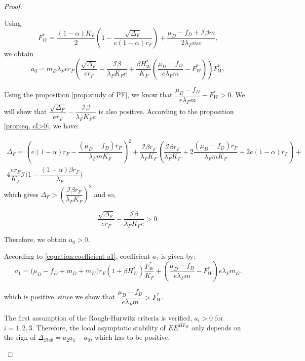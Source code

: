\documentclass{article}
\newcommand{\lfw}{\lambda_{F}}
\newcommand{\lfw}{\lambda_{F}}
\newcommand{\cI}{\mathcal{I}}
\begin{document}
\begin{proof}
\begin{itemize}
Using
\begin{equation*}
F_W^* = \dfrac{(1-\alpha)K_F}{2}\left(1 - \dfrac{\sqrt{\Delta_F}}{e(1-\alpha)r_F}\right) + \dfrac{\mu_D - f_D + \cI \beta m}{2\lfw m e},
\end{equation*}
we obtain
\begin{equation*}
a_0 = m_D \lfw e r_F \left(\dfrac{\sqrt{\Delta_F}}{er_F} - \dfrac{\cI \beta}{\lfw K_F e} +  \dfrac{\beta H_W^*}{K_F} \left(\dfrac{\mu_D -f_D }{e \lfw m} - F_W^*\right)\right)  F^*_{W},
\end{equation*}

Using the proposition \ref{prop:study of PF}, we know that $\dfrac{\mu_D -f_D }{e \lfw m} - F_W^* > 0$. We will show that  $\dfrac{\sqrt{\Delta_F}}{er_F} - \dfrac{\cI \beta}{\lfw K_F e}$ is also positive. According to the proposition \ref{prop:eq, cI>0}, we have:

\begin{multline*}
\Delta_F = \left(e(1-\alpha)r_F - \dfrac{(\mu_D - f_D) r_F}{\lfw m K_F}\right)^2 + \dfrac{\cI \beta r_F}{\lfw K_F} \left(\dfrac{\cI \beta r_F}{\lfw K_F} + 2\dfrac{(\mu_D - f_D) r_F}{\lfw m K_F} + 2e(1-\alpha)r_F \right) + \\ 4\dfrac{er_F}{K_F}  \cI\Big(1 - \dfrac{(1-\alpha)\beta r_F}{\lfw} \Big)
\end{multline*}
 which gives $\Delta_F > \left(\dfrac{\cI \beta r_F}{\lfw K_F}\right)^2$ and so,

\begin{equation*}
\dfrac{\sqrt{\Delta_F}}{er_F} - \dfrac{\cI \beta}{\lfw K_F e} > 0.
\end{equation*}

Therefore, we obtain $a_0 > 0$.

According to \eqref{equation:coefficient a1}, coefficient $a_1$ is given by:
\begin{equation*}
a_1 = \big( \mu_D  -f_D + m_D + m_W) r_F(1+ \beta H_W^*) \dfrac{F^*_W}{K_F} + \left(\dfrac{\mu_D -f_D}{e\lfw m} - F_W^*\right) e \lfw m_D .
\end{equation*}

which is positive, since we show that $\dfrac{\mu_D - f_D}{e \lfw m} > F^*_{W}$.

The first assumption of the Rough-Hurwitz criteria is verified, $a_i > 0$ for $i=1,2,3$. Therefore, the local asymptotic stability of $EE^{HF_W}$ only depends on the sign of $\Delta_{Stab}= a_2 a_1 - a_0$, which has to be positive.
\end{itemize}
\end{proof}
\end{document}
